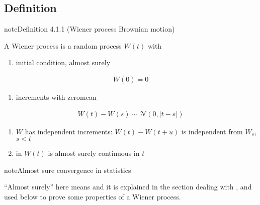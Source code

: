 \documentclass[letterpaper,10pt,english]{jupyterBook}
\begin{document}
\subsection{Definition}
\label{\detokenize{ch/prob/wiener:definition}}\label{\detokenize{ch/prob/wiener:prob-processes-wiener-def}}\label{ch/prob/wiener:wiener:def}
\begin{sphinxadmonition}{note}{Definition 4.1.1 (Wiener process \sphinxhyphen{} Brownian motion)}



\sphinxAtStartPar
A Wiener process is a random process \(W(t)\) with
\begin{enumerate}
%
\item {} 
\sphinxAtStartPar
initial condition, almost surely

\end{enumerate}
\begin{equation*}
\begin{split}W(0) = 0\end{split}
\end{equation*}\begin{enumerate}
%
\setcounter{enumi}{1}
\item {} 
\sphinxAtStartPar
increments with zero\sphinxhyphen{}mean {\hyperref[\detokenize{ch/prob/rv-continuous:prob-rv-continuous-ex-normal}]{}}

\end{enumerate}
\begin{equation*}
\begin{split}W(t) - W(s) \sim \mathscr{N}(0,|t-s|)\end{split}
\end{equation*}\begin{enumerate}
%
\setcounter{enumi}{2}
\item {} 
\sphinxAtStartPar
\(W\) has independent increments: \(W(t) - W(t+u)\) is independent from \(W_s\), \(s < t\)

\item {} 
\sphinxAtStartPar
in \(W(t)\) is almost surely continuous in \(t\)

\end{enumerate}
\end{sphinxadmonition}

\begin{sphinxadmonition}{note}{Almost sure convergence in statistics}

\sphinxAtStartPar
“Almost surely” here means {\hyperref[\detokenize{ch/prob/convergence:prob-convergence-strong}]{}} and it is explained in the section dealing with {\hyperref[\detokenize{ch/prob/convergence:prob-convergence}]{}}, and used below to prove some properties of a Wiener process.
\end{sphinxadmonition}
\end{document}
